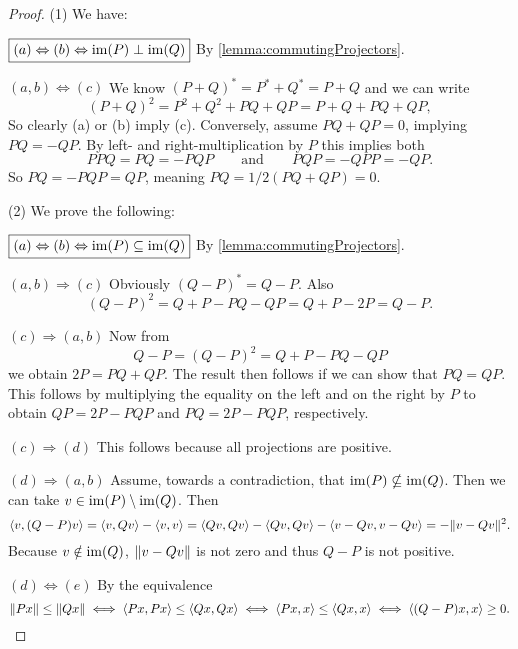 \begin{proof}
(1) We have:

$\boxed{(a)\Leftrightarrow (b) \Leftrightarrow \operatorname{im}(P) \perp \operatorname{im}(Q)}$ By \ref{lemma:commutingProjectors}.

$\boxed{(a, b)\Leftrightarrow (c)}$ We know $(P+Q)^* = P^*+Q^* =P+Q$ and we can write
\[ (P+Q)^2 = P^2 + Q^2 + PQ + QP = P+Q+ PQ+QP,  \]
So clearly (a) or (b) imply (c). Conversely, assume $PQ + QP = 0$, implying $PQ=-QP$. By left- and right-multiplication by $P$ this implies both
\[ PPQ = PQ = -PQP \qquad \text{and} \qquad PQP = -QPP = -QP. \]
So $PQ = -PQP = QP$, meaning $PQ = 1/2(PQ+QP) = 0$.

(2) We prove the following:

$\boxed{(a)\Leftrightarrow (b) \Leftrightarrow \operatorname{im}(P) \subseteq \operatorname{im}(Q)}$ By \ref{lemma:commutingProjectors}.

$\boxed{(a,b)\Rightarrow (c)}$ Obviously $(Q-P)^*= Q-P$. Also
\[ (Q-P)^2 = Q+P-PQ-QP= Q+P-2P = Q-P. \]

$\boxed{(c)\Rightarrow (a,b)}$ Now from
\[ Q-P = (Q-P)^2 = Q+P-PQ-QP \]
we obtain $2P = PQ+QP$. The result then follows if we can show that $PQ=QP$. This follows by multiplying the equality on the left and on the right by $P$ to obtain $QP = 2P-PQP$ and $PQ = 2P-PQP$, respectively. 

$\boxed{(c)\Rightarrow (d)}$ This follows because all projections are positive.

$\boxed{(d)\Rightarrow (a, b)}$ Assume, towards a contradiction, that $\operatorname{im}(P)\nsubseteq \operatorname{im}(Q)$. Then we can take $v\in\operatorname{im}(P)\setminus \operatorname{im}(Q)$. Then
\[ \left\langle v,(Q-P)v \right\rangle = \left\langle v,Qv \right\rangle - \left\langle v,v \right\rangle = \left\langle Qv,Qv \right\rangle - \left\langle Qv,Qv \right\rangle - \left\langle v-Qv, v-Qv \right\rangle = -\lVert v-Qv\rVert^2. \]
Because $v\notin \operatorname{im}(Q)$, $\lVert v-Qv\rVert$ is not zero and thus $Q-P$ is not positive.

$\boxed{(d)\Leftrightarrow (e)}$ By the equivalence
\[ \lVert Px\rVert \leq \lVert Qx\rVert \iff \left\langle Px,Px \right\rangle \leq \left\langle Qx,Qx \right\rangle \iff \left\langle Px,x \right\rangle\leq \left\langle Qx,x \right\rangle \iff \left\langle (Q-P)x,x \right\rangle\geq 0. \]
\end{proof}

